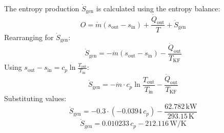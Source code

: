The entropy production \( \dot{S}_{\text{gen}} \) is calculated using the entropy balance:  
\[
O = \dot{m} \left( s_{\text{out}} - s_{\text{in}} \right) + \frac{\dot{Q}_{\text{out}}}{T} + \dot{S}_{\text{gen}}
\]  
Rearranging for \( \dot{S}_{\text{gen}} \):  
\[
\dot{S}_{\text{gen}} = -\dot{m} \left( s_{\text{out}} - s_{\text{in}} \right) - \frac{\dot{Q}_{\text{out}}}{T_{\text{KF}}}
\]  
Using \( s_{\text{out}} - s_{\text{in}} = c_p \ln \frac{T_{\text{out}}}{T_{\text{in}}} \):  
\[
\dot{S}_{\text{gen}} = -\dot{m} \cdot c_p \ln \frac{T_{\text{out}}}{T_{\text{in}}} - \frac{\dot{Q}_{\text{out}}}{T_{\text{KF}}}
\]  
Substituting values:  
\[
\dot{S}_{\text{gen}} = -0.3 \cdot (-0.0394 \, c_p) - \frac{62.782 \, \text{kW}}{293.15 \, \text{K}}
\]  
\[
\dot{S}_{\text{gen}} = 0.010233 \, c_p - 212.116 \, \text{W/K}
\]